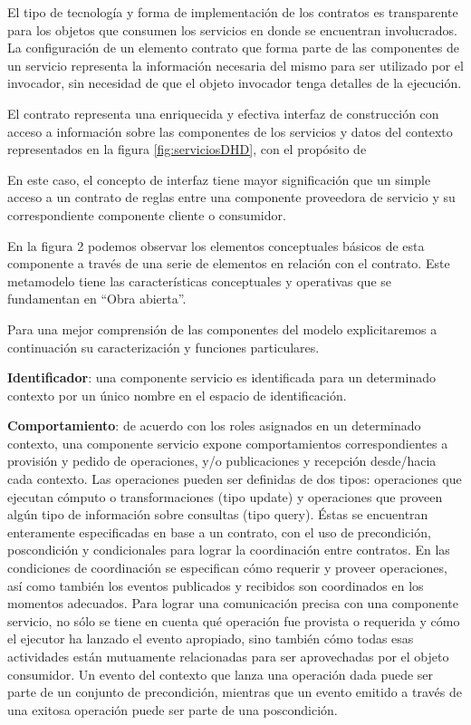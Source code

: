 \begin{itemize}
El tipo de tecnología y forma de implementación de los contratos es transparente para los objetos que consumen los servicios en donde se encuentran involucrados. La configuración de un elemento contrato que forma parte de las componentes de un servicio representa la información necesaria del mismo para ser utilizado por el invocador, sin necesidad de que el objeto invocador tenga detalles de la ejecución.

El contrato representa una enriquecida y efectiva interfaz de construcción con acceso a información sobre las componentes de los servicios y datos del contexto representados en la figura \ref{fig:serviciosDHD}, con el propósito de 


En este caso, el concepto de interfaz tiene mayor significación que un simple acceso a un contrato de reglas entre una  componente proveedora de servicio y su correspondiente componente cliente o consumidor.

En la figura 2 podemos observar los elementos conceptuales básicos de esta componente a través de una serie de elementos en relación con el contrato. Este metamodelo tiene las características conceptuales y operativas que se fundamentan en “Obra abierta”.

Para una mejor comprensión de las componentes del modelo explicitaremos
a continuación su caracterización y funciones particulares.

\textbf{Identificador}: una componente servicio es identificada para un
determinado
contexto por un único nombre en el espacio de identificación.

\textbf{Comportamiento}: de acuerdo con los roles asignados en un determinado
contexto, una componente servicio expone comportamientos correspondientes a
provisión y pedido de operaciones, y/o publicaciones y recepción desde/hacia
cada contexto. Las operaciones pueden ser definidas de dos tipos: operaciones
que ejecutan cómputo o transformaciones (tipo update) y operaciones que proveen
algún tipo de información sobre consultas (tipo query). Éstas se encuentran
enteramente especificadas en base a un contrato, con el uso de precondición,
poscondición y condicionales para lograr la coordinación entre contratos. En las
condiciones de coordinación se especifican cómo requerir y proveer operaciones,
así como también los eventos publicados y recibidos son coordinados en los
momentos adecuados. Para lograr una comunicación precisa con una componente
servicio, no sólo se tiene en cuenta qué operación fue provista o requerida
y cómo el ejecutor ha lanzado el evento apropiado, sino también cómo todas
esas actividades están mutuamente relacionadas para ser aprovechadas por el
objeto consumidor. Un evento del contexto que lanza una operación dada
puede ser parte de un conjunto de precondición, mientras que un evento emitido
a través de una exitosa operación puede ser parte de una poscondición.



\end{itemize}
